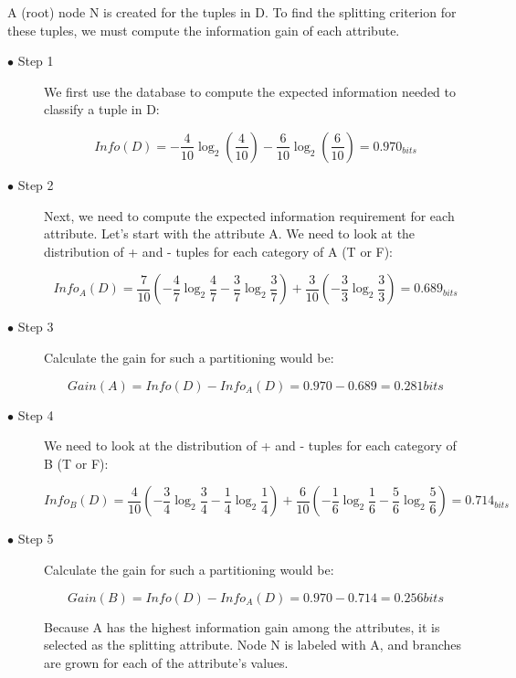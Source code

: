 \documentclass[a4paper]{article}
\begin{document}
A (root) node N is created for the tuples in D. To find the splitting criterion for these tuples, we must compute the information gain of each attribute.

\newpage

\begin{description}
    \item[$\bullet$ Step 1] We first use the database to compute the expected information needed to classify a tuple in D:

    \[ Info(D)
      = - \dfrac{4}{10} \log _{2} \left(\dfrac{4}{10}\right) - \dfrac{6}{10} \log _{2} \left(\dfrac{6}{10}\right) = 0.970_{bits}
    \]

    \item[$\bullet$ Step 2] Next, we need to compute the expected information requirement for each attribute. Let’s start with the attribute A. We need to look at the distribution of + and - tuples for each category of A (T or F):

    \[ Info_A(D)
      = \dfrac{7}{10} \left(-\dfrac{4}{7} \log _{2} \dfrac{4}{7} - \dfrac{3}{7} \log _{2} \dfrac{3}{7} \right) +
      \dfrac{3}{10} \left(-\dfrac{3}{3} \log _{2} \dfrac{3}{3}\right)
      = 0.689 _{bits}
    \]

    \item[$\bullet$ Step 3] Calculate the gain for such a partitioning would be:

     \[ Gain(A)
      = Info(D) - Info_A(D) = 0.970 - 0.689 = 0.281 bits
    \]

    \item[$\bullet$ Step 4]  We need to look at the distribution of + and - tuples for each category of B (T or F):

    \[ Info_B(D)
      = \dfrac{4}{10} \left(-\dfrac{3}{4} \log _{2} \dfrac{3}{4} - \dfrac{1}{4} \log _{2} \dfrac{1}{4}\right) +
      \dfrac{6}{10} \left(-\dfrac{1}{6} \log _{2} \dfrac{1}{6} - \dfrac{5}{6} \log _{2} \dfrac{5}{6}\right)
      = 0.714_{bits}
    \]

    \item[$\bullet$ Step 5]  Calculate the gain for such a partitioning would be:

    \[ Gain(B)
      = Info(D) - Info_A(D) = 0.970 - 0.714 = 0.256 bits
    \]

    Because A has the highest information gain among the attributes, it is selected as the splitting attribute. Node N is labeled with A, and branches are grown for each of the attribute’s values.

\end{description}
\end{document}
